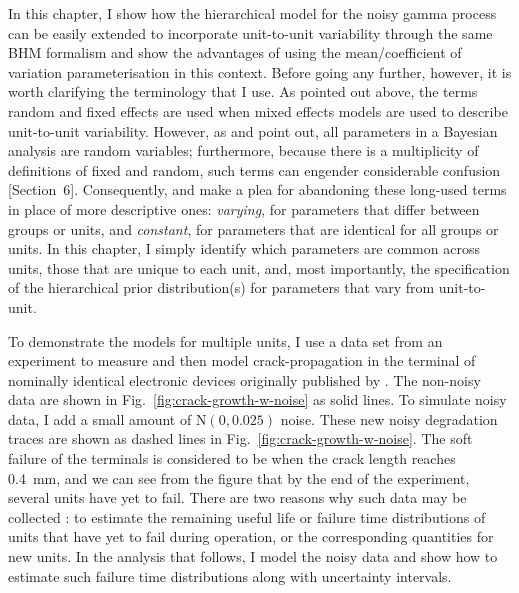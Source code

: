 In this chapter, I show how the hierarchical model for the noisy gamma process can be easily extended to incorporate unit-to-unit variability through the same BHM formalism and show the advantages of using the mean/coefficient of variation parameterisation in this context. Before going any further, however, it is worth clarifying the terminology that I use. As pointed out above, the terms random and fixed effects are used when mixed effects models are used to describe unit-to-unit variability. However, as \citet{Gelman2005} and \citet{gelman2006} point out, all parameters in a Bayesian analysis are random variables; furthermore, because there is a multiplicity of definitions of fixed and random, such terms can engender considerable confusion [Section~6]\citep{Gelman2005}. Consequently, \citet{Gelman2005} and \citet{gelman2006} make a plea for abandoning these long-used terms in place of more descriptive ones: \emph{varying}, for parameters that differ between groups or units, and \emph{constant}, for parameters that are identical for all groups or units. In this chapter, I simply identify which parameters are common across units, those that are unique to each unit, and, most importantly, the specification of the hierarchical prior distribution(s) for parameters that vary from unit-to-unit.

To demonstrate the models for multiple units, I use a data set from an experiment to measure and then model crack-propagation in the terminal of nominally identical electronic devices originally published by \citet{rodriguez-picon2018}. The non-noisy data are shown in Fig.~\ref{fig:crack-growth-w-noise} as solid lines. To simulate noisy data, I add a small amount of $\mathrm{N}(0, 0.025)$ noise. These new noisy degradation traces are shown as dashed lines in Fig.~\ref{fig:crack-growth-w-noise}. The soft failure of the terminals is considered to be when the crack length reaches 0.4~mm, and we can see from the figure that by the end of the experiment, several units have yet to fail. There are two reasons why such data may be collected \citep{robinson2000}: to estimate the remaining useful life or failure time distributions of units that have yet to fail during operation, or the corresponding quantities for new units. In the analysis that follows, I model the noisy data and show how to estimate such failure time distributions along with uncertainty intervals.

